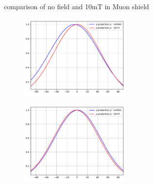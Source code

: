 \begin{frame}[t]{comparison of no field and 10mT in Muon shield}
  \begin{multicols}{2}
    \begin{figure}
      \centering
      \includegraphics[width=0.5\textwidth]{../hists/nofield/comp/gauss_comparison_y-_10mT.pdf}
    \end{figure}
    \columnbreak
    \begin{figure}
      \centering
      \includegraphics[width=0.5\textwidth]{../hists/nofield/comp/gauss_comparison_y+_10mT.pdf}
    \end{figure}
  \end{multicols}
\end{frame}

